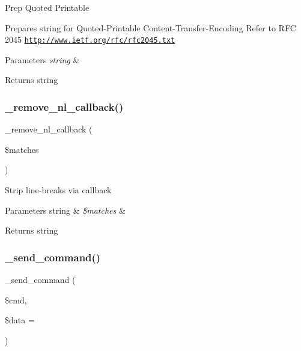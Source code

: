 Prep Quoted Printable

Prepares string for Quoted-\/\+Printable Content-\/\+Transfer-\/\+Encoding Refer to R\+FC 2045 \href{http://www.ietf.org/rfc/rfc2045.txt}{\tt http\+://www.\+ietf.\+org/rfc/rfc2045.\+txt}


\begin{DoxyParams}{Parameters}
{\em string} & \\
\hline
\end{DoxyParams}
\begin{DoxyReturn}{Returns}
string 
\end{DoxyReturn}
\mbox{\label{class_c_i___email_a3a624f07cca99fe6ab1b61dbec56eef8}} 
\subsubsection{\texorpdfstring{\+\_\+remove\+\_\+nl\+\_\+callback()}{\_remove\_nl\_callback()}}
{\footnotesize\ttfamily \+\_\+remove\+\_\+nl\+\_\+callback (\begin{DoxyParamCaption}\item[{}]{\$matches }\end{DoxyParamCaption})\hspace{0.3cm}{\ttfamily [protected]}}

Strip line-\/breaks via callback


\begin{DoxyParams}[1]{Parameters}
string & {\em \$matches} & \\
\hline
\end{DoxyParams}
\begin{DoxyReturn}{Returns}
string 
\end{DoxyReturn}
\mbox{\label{class_c_i___email_a5431c3309ee720b3d1cc55c892359371}} 
\subsubsection{\texorpdfstring{\+\_\+send\+\_\+command()}{\_send\_command()}}
{\footnotesize\ttfamily \+\_\+send\+\_\+command (\begin{DoxyParamCaption}\item[{}]{\$cmd,  }\item[{}]{\$data = {\ttfamily \textquotesingle{}\textquotesingle{}} }\end{DoxyParamCaption})\hspace{0.3cm}{\ttfamily [protected]}}

